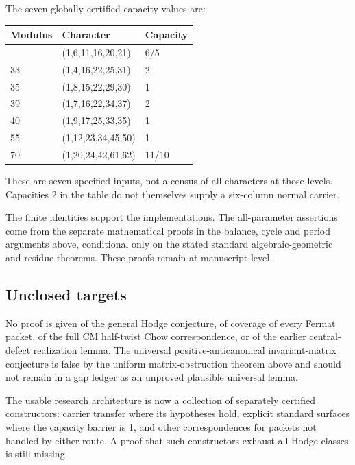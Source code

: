The seven globally certified capacity values are:

\begin{longtable}[]{@{}lll@{}}
\toprule\noalign{}
Modulus & Character & Capacity \\
\midrule\noalign{}
\endhead
\bottomrule\noalign{}
\endlastfoot
25 & (1,6,11,16,20,21) & 6/5 \\
33 & (1,4,16,22,25,31) & 2 \\
35 & (1,8,15,22,29,30) & 1 \\
39 & (1,7,16,22,34,37) & 2 \\
40 & (1,9,17,25,33,35) & 1 \\
55 & (1,12,23,34,45,50) & 1 \\
70 & (1,20,24,42,61,62) & 11/10 \\
\end{longtable}

These are seven specified inputs, not a census of all characters at
those levels. Capacities 2 in the table do not themselves supply a
six-column normal carrier.

The finite identities support the implementations. The all-parameter
assertions come from the separate mathematical proofs in the balance,
cycle and period arguments above, conditional only on the stated
standard algebraic-geometric and residue theorems. These proofs remain
at manuscript level.

\hypertarget{capacity_cycles-unclosed-targets}{%
\subsection{Unclosed targets}\label{capacity_cycles-unclosed-targets}}

No proof is given of the general Hodge conjecture, of coverage of every
Fermat packet, of the full CM half-twist Chow correspondence, or of the
earlier central-defect realization lemma. The universal
positive-anticanonical invariant-matrix conjecture is false by the
uniform matrix-obstruction theorem above and should not remain in a gap
ledger as an unproved plausible universal lemma.

The usable research architecture is now a collection of separately
certified constructors: carrier transfer where its hypotheses hold,
explicit standard surfaces where the capacity barrier is 1, and other
correspondences for packets not handled by either route. A proof that
such constructors exhaust all Hodge classes is still missing.
